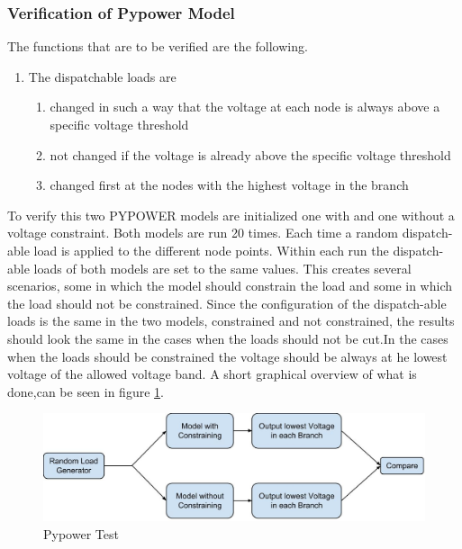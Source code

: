 \documentclass[a4paper]{article}
\begin{document}
\subsubsection{Verification of Pypower Model}
The functions that are to be verified are the following. 
\begin{enumerate}
 \item The dispatchable loads are \begin{enumerate}
                                   \item changed in such a way that  the voltage at each node is 
                                   always above a specific voltage threshold
                                   \item not changed if the voltage is already above the specific voltage threshold
                                   \item changed first at the nodes with the highest voltage in the branch
                                  \end{enumerate}

\end{enumerate}
To verify this two PYPOWER models are initialized one with and  one without a voltage constraint. Both models are 
run 20 times. Each time a random dispatch-able load is applied to the different node points. Within each run the 
dispatch-able loads of both models are set to the same values. This creates several scenarios, 
some in which the model should constrain the load and some in which the load should not be constrained. Since the configuration of the 
dispatch-able loads is the same in the two models, constrained and not constrained, the results should look the same in the cases when 
the loads should not be cut.In the cases when the loads should be constrained the voltage should be always at he lowest voltage of the 
allowed voltage band. A short graphical overview of what is done,can be seen in figure \ref{test_pypower}.\\
\begin{figure}[!ht]
\includegraphics[width =\textwidth]{Pypower_verification.jpg}
\caption{Pypower Test}
\label{test_pypower}
\end{figure}
\end{document}
